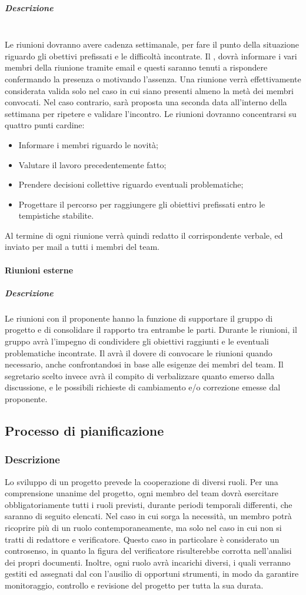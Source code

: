 \subparagraph{Descrizione}
~\\Le riunioni dovranno avere cadenza settimanale, per fare il punto della situazione riguardo gli obettivi prefissati e
le difficoltà incontrate. Il \RdP{}, dovrà informare i vari membri della riunione tramite email e questi saranno tenuti a rispondere confermando la presenza o motivando l'assenza. Una riunione verrà effettivamente considerata
valida solo nel caso in cui siano presenti almeno la metà dei membri convocati. Nel caso contrario, sarà proposta una seconda data all'interno della settimana per ripetere e validare l'incontro.
Le riunioni dovranno concentrarsi su quattro punti cardine:
\begin{itemize}
	\item Informare i membri riguardo le novità;
	\item Valutare il lavoro precedentemente fatto;
	\item Prendere decisioni collettive riguardo eventuali problematiche;
	\item Progettare il percorso per raggiungere gli obiettivi prefissati entro le tempistiche stabilite.
\end{itemize}
Al termine di ogni riunione verrà quindi redatto il corrispondente verbale, ed inviato per mail a tutti i membri del team.

\paragraph{Riunioni esterne}
\subparagraph{Descrizione}
Le riunioni con il proponente hanno la funzione di supportare il gruppo di progetto e di consolidare il rapporto tra entrambe le parti. Durante le riunioni, il gruppo avrà l'impegno di condividere gli obiettivi raggiunti e le eventuali problematiche incontrate. 
Il \RdP{} avrà il dovere di convocare le riunioni quando necessario, anche confrontandosi in base alle esigenze dei membri del team. Il segretario scelto invece avrà il compito di verbalizzare quanto emerso dalla discussione, e le possibili richieste di cambiamento e/o correzione emesse dal proponente.

\subsection{Processo di pianificazione}
\subsubsection{Descrizione}
Lo sviluppo di un progetto prevede la cooperazione di diversi ruoli. Per una comprensione unanime del progetto, ogni membro del team dovrà esercitare obbligatoriamente tutti i ruoli previsti, durante periodi temporali differenti, che saranno di seguito elencati. Nel caso in cui sorga la necessità, un membro potrà ricoprire più di un ruolo contemporaneamente, ma solo nel caso in cui non si tratti di redattore e verificatore. Questo caso in particolare è considerato un controsenso, in quanto la figura del verificatore risulterebbe corrotta nell'analisi dei propri documenti. Inoltre, ogni ruolo avrà incarichi diversi, i quali verranno gestiti ed assegnati dal \RdP{} con l'ausilio di opportuni strumenti, in modo da garantire monitoraggio, controllo e revisione del progetto per tutta la sua durata.
